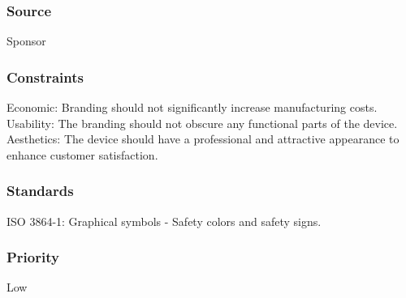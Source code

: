 \subsubsection{Source}
Sponsor
\subsubsection{Constraints}
Economic: Branding should not significantly increase manufacturing costs.
Usability: The branding should not obscure any functional parts of the device.
Aesthetics: The device should have a professional and attractive appearance to enhance customer satisfaction.
\subsubsection{Standards}
ISO 3864-1: Graphical symbols - Safety colors and safety signs.
\subsubsection{Priority}
Low
